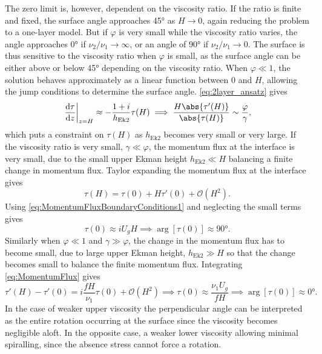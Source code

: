 The zero limit is, however, dependent on the viscosity ratio. If the ratio is finite and fixed, the surface angle approaches \ang{45} as $H \rightarrow 0$, again reducing the problem to a one-layer model. But if $\varphi$ is very small while the viscosity ratio varies, the angle approaches \ang{0} if $\nu_2 / \nu_1 \rightarrow \infty$, or an angle of \ang{90} if $\nu_2/\nu_1 \rightarrow 0$. The surface is thus sensitive to the viscosity ratio when $ \varphi $ is small, as the surface angle can be either above or below \ang{45} depending on the viscosity ratio. When $ \varphi \ll 1 $, the solution behaves approximately as a linear function between $0$ and $H$, allowing the jump conditions to determine the surface angle. \autoref{eq:2layer_ansatz} gives
\begin{equation}
\left.\frac{\mathrm{d}\tau}{\mathrm{d}z}\right|_{z=H} \approx - \frac{1+i}{h_\text{Ek2}} \tau(H) \implies \frac{H\abs{\tau'(H)}}{\abs{\tau(H)}}\sim\frac{\varphi}{\gamma},
\end{equation}
which puts a constraint on $\tau(H)$ as $h_\text{Ek2}$ becomes very small or very large. If the viscosity ratio is very small, $\gamma\ll\varphi$, the momentum flux at the interface is very small, due to the small upper Ekman height $h_\text{Ek2}\ll H$ balancing a finite change in momentum flux. Taylor expanding the momentum flux at the interface gives 
\begin{equation}
    \tau(H)=\tau(0)+H\tau'(0)+\mathcal{O}\left(H^2\right).
\end{equation}
Using \autoref{eq:MomentumFluxBoundaryConditions1} and neglecting the small terms gives 
\begin{equation}
    \tau(0)\approx iU_gH \implies \arg[\tau(0)]\approx\ang{90}. 
\end{equation}
Similarly when $ \varphi \ll 1 $ and $\gamma\gg\varphi$, the change in the momentum flux has to become small, due to large upper Ekman height, $h_\text{Ek2}\gg H$ so that the change becomes small to balance the finite momentum flux. Integrating \autoref{eq:MomentumFlux} gives 
\begin{equation}
    \tau'(H)-\tau'(0)= i\frac{fH}{\nu_1}\tau(0)+\mathcal{O}\left(H^2\right) \implies \tau(0)\approx \frac{\nu_1 U_g}{fH} \implies \arg[\tau(0)]\approx\ang{0}. 
\end{equation}
In the case of weaker upper viscosity the perpendicular angle can be interpreted as the entire rotation occurring at the surface since the viscosity becomes negligible aloft. In the opposite case, a weaker lower viscosity allowing minimal spiralling, since the absence stress cannot force a rotation. 

